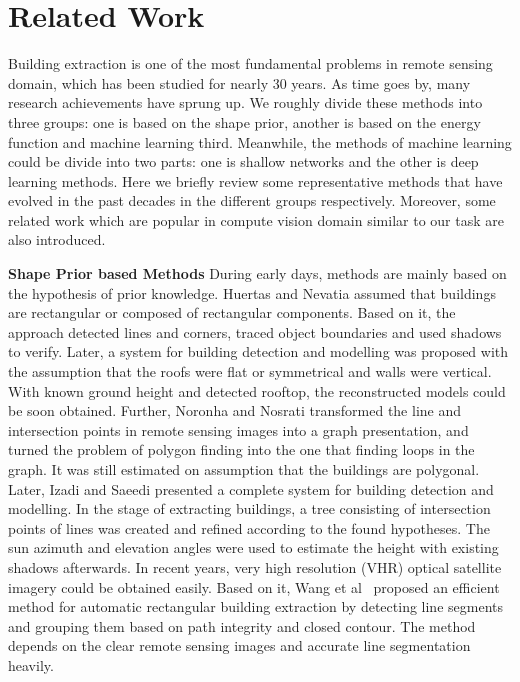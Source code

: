 \section{Related Work}
\label{Sec:RelatedWork}


Building extraction is one of the most fundamental problems in remote sensing domain, which has been studied for nearly 30 years.
As time goes by, many research achievements have sprung up.
We roughly divide these methods into three groups: one is based on the shape prior, another is based on the energy function and machine learning third. Meanwhile, the methods of machine learning could be divide into two parts: one is shallow networks and the other is deep learning methods.
Here we briefly review some representative methods that have evolved in the past decades in the different groups respectively.
Moreover, some related work which are popular in compute vision domain similar to our task are also introduced.



\textbf{Shape Prior based Methods} During early days, methods are mainly based on the hypothesis of prior knowledge.
Huertas and Nevatia \cite{IEEEexample:huertas1988detecting} assumed that buildings are rectangular or composed of rectangular components.
Based on it, the approach detected lines and corners, traced object boundaries and used shadows to verify.
Later, a system \cite{IEEEexample:noronha2001detection} for building detection and modelling was proposed with the assumption that the roofs were flat or symmetrical and walls were vertical.
With known ground height and detected rooftop, the reconstructed models could be soon obtained.
Further, Noronha and Nosrati \cite{IEEEexample:nosrati2009novel} transformed the line and intersection points in remote sensing images into a graph presentation, and turned the problem of polygon finding into the one that finding loops in the graph.
It was still estimated on assumption that the buildings are polygonal.
Later, Izadi and Saeedi\cite{IEEEexample:izadi2012three} presented a complete system for building detection and modelling.
In the stage of extracting buildings, a tree consisting of intersection points of lines was created and refined according to the found hypotheses.
The sun azimuth and elevation angles were used to estimate the height with existing shadows afterwards.
In recent years, very high resolution (VHR) optical satellite imagery could be obtained easily.
Based on it, Wang et al~\cite{IEEEexample:wang2015efficient} proposed an efficient method for automatic rectangular building extraction by detecting line segments and grouping them based on path integrity and closed contour. The method depends on the clear remote sensing images and accurate line segmentation heavily.


